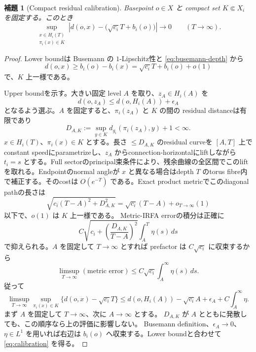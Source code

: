 \documentclass[11pt,a4paper]{ltjsarticle}
\theoremstyle{plain}
\newtheorem{lemma}[lemma]{補題}
\theoremstyle{definition}
\theoremstyle{remark}
\begin{document}
\begin{lemma}[Compact residual calibration]
\label{lem:calibration}
Basepoint $o\in X$ と compact set $K\Subset X_i$ を固定する。このとき
\begin{equation}
\label{eq:calibration}
 \sup_{\substack{x\in H_i(T)\\ \pi_i(x)\in K}}
 \left|
 d(o,x)-\bigl(\sqrt{c_i}T+b_i(o)\bigr)
 \right|\longrightarrow0
 \qquad(T\to\infty).
\end{equation}
\end{lemma}
\begin{proof}
Lower boundは Busemann の $1$-Lipschitz性と \eqref{eq:busemann-depth} から
\[
 d(o,x)\ge b_i(o)-b_i(x)
 =\sqrt{c_i}T+b_i(o)+o(1)
\]
で、$K$ 上一様である。

Upper boundを示す。大きい固定 level $A$ を取り、$z_A\in H_i(A)$ を
\[
 d(o,z_A)\le d(o,H_i(A))+\epsilon_A
\]
となるよう選ぶ。$A$ を固定すると、$\pi_i(z_A)$ と $K$ の間の residual distanceは有限であり
\[
 D_{A,K}:=\sup_{y\in K}d_{g_i}(\pi_i(z_A),y)+1<\infty.
\]
$x\in H_i(T)$、$\pi_i(x)\in K$ とする。長さ $\le D_{A,K}$ のresidual curveを $[A,T]$ 上でconstant speedにparametrizeし、$z_A$ からconnection-horizontalにliftしながら $t_i=s$ とする。Full sectorのprincipal束条件により、残余曲線の全区間でこのliftを取れる。Endpointのnormal angleが $x$ と異なる場合はdepth $T$ のtorus fibre内で補正する。そのcostは $O(e^{-T})$ である。Exact product metricでこのdiagonal pathの長さは
\[
 \sqrt{c_i(T-A)^2+D_{A,K}^2}
 =\sqrt{c_i}(T-A)+o_{T\to\infty}(1)
\]
以下で、$o(1)$ は $K$ 上一様である。
Metric-IRFA errorの積分は正確に
\[
 C\sqrt{c_i+\left(\frac{D_{A,K}}{T-A}\right)^2}
 \int_A^T\eta(s)\,ds
\]
で抑えられる。$A$ を固定して $T\to\infty$ とすれば prefactor は $C\sqrt{c_i}$ に収束するから
\[
 \limsup_{T\to\infty}(\text{metric error})
 \le C\sqrt{c_i}\int_A^\infty\eta(s)\,ds.
\]
従って
\[
 \limsup_{T\to\infty}\sup_{\pi_i(x)\in K}
 \{d(o,x)-\sqrt{c_i}T\}
 \le d(o,H_i(A))-\sqrt{c_i}A+\epsilon_A
 +C\int_A^\infty\eta.
\]
まず $A$ を固定して $T\to\infty$、次に $A\to\infty$ とする。
$D_{A,K}$ が $A$ とともに発散しても、この順序なら上の評価に影響しない。
Busemann definition、$\epsilon_A\to0$、$\eta\in L^1$ を用いれば右辺は $b_i(o)$ へ収束する。Lower boundと合わせて \eqref{eq:calibration} を得る。
\end{proof}
\end{document}
